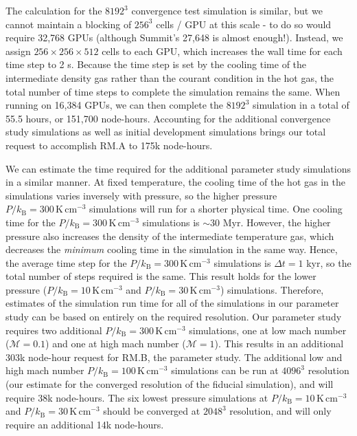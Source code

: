 \documentclass[11pt,letterpaper,english]{article}
\begin{document}
The calculation for the $8192^3$ convergence test simulation is similar, but we cannot maintain a blocking of $256^3$ cells / GPU at this scale - to do so would require 32,768 GPUs (although Summit's 27,648 is almost enough!). Instead, we assign $256\times256\times512$ cells to each GPU, which increases the wall time for each time step to 2 s. Because the time step is set by the cooling time of the intermediate density gas rather than the courant condition in the hot gas, the total number of time steps to complete the simulation remains the same. When running on 16,384 GPUs, we can then complete the $8192^3$ simulation in a total of 55.5 hours, or 151,700 node-hours. Accounting for the additional convergence study simulations as well as initial development simulations brings our total request to accomplish RM.A to 175k node-hours.

We can estimate the time required for the additional parameter study simulations in a similar manner. At fixed temperature, the cooling time of the hot gas in the simulations varies inversely with pressure, so the higher pressure $P/k_\mathrm{B} = 300\,\mathrm{K}\,\mathrm{cm}^{-3}$ simulations will run for a shorter physical time. One cooling time for the $P/k_\mathrm{B} = 300\,\mathrm{K}\,\mathrm{cm}^{-3}$ simulations is $\sim 30$ Myr. However, the higher pressure also increases the density of the intermediate temperature gas, which decreases the {\it minimum} cooling time in the simulation in the same way. Hence, the average time step for the $P/k_\mathrm{B} = 300\,\mathrm{K}\,\mathrm{cm}^{-3}$ simulations is $\Delta t = 1$ kyr, so the total number of steps required is the same. This result holds for the lower pressure ($P/k_\mathrm{B} = 10\,\mathrm{K}\,\mathrm{cm}^{-3}$ and $P/k_\mathrm{B} = 30\,\mathrm{K}\,\mathrm{cm}^{-3}$) simulations. Therefore, estimates of the simulation run time for all of the simulations in our parameter study can be based on entirely on the required resolution. Our parameter study requires two additional $P/k_\mathrm{B} = 300\,\mathrm{K}\,\mathrm{cm}^{-3}$ simulations, one at low mach number ($\mathcal{M} = 0.1$) and one at high mach number ($\mathcal{M} = 1$). This results in an additional 303k node-hour request for RM.B, the parameter study. The additional low and high mach number $P/k_\mathrm{B} = 100\,\mathrm{K}\,\mathrm{cm}^{-3}$ simulations can be run at $4096^3$ resolution (our estimate for the converged resolution of the fiducial simulation), and will require 38k node-hours. The six lowest pressure simulations at $P/k_\mathrm{B} = 10\,\mathrm{K}\,\mathrm{cm}^{-3}$ and $P/k_\mathrm{B} = 30\,\mathrm{K}\,\mathrm{cm}^{-3}$ should be converged at $2048^3$ resolution, and will only require an additional 14k node-hours.
\end{document}
